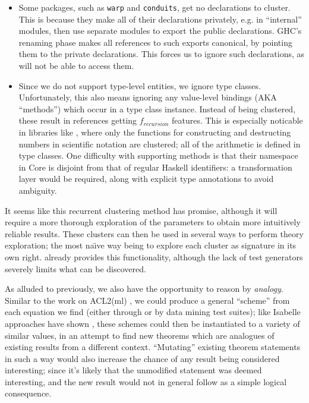 \begin{itemize}
\item Some packages, such as \texttt{warp} and \texttt{conduits}, get no
  declarations to cluster. This is because they make all of their declarations
  privately, e.g. in ``internal'' modules, then use separate modules to export
  the public declarations. GHC's renaming phase makes all references to such
  exports canonical, by pointing them to the private declarations. This forces
  us to ignore such declarations, as \quickspec{} will not be able to access them.

\item Since we do not support type-level entities, we ignore type
  classes. Unfortunately, this also means ignoring any value-level bindings (AKA
  ``methods'') which occur in a type class instance. Instead of being clustered,
  these result in references getting $f_{recursion}$ features. This is
  especially noticable in libraries like , where only the
  functions for constructing and destructing numbers in scientific notation are
  clustered; all of the arithmetic is defined in type classes. One difficulty
  with supporting methods is that their namespace in Core is disjoint from that
  of regular Haskell identifiers: a transformation layer would be required,
  along with explicit type annotations to avoid ambiguity.
\end{itemize}

It seems like this recurrent clustering method has promise, although it will
require a more thorough exploration of the parameters to obtain more intuitively
reliable results. These clusters can then be used in several ways to perform
theory exploration; the most na\"{\i}ve way being to explore each cluster as
\quickspec{} signature in its own right. \mlforhs{} already provides this
functionality, although the lack of test generators severely limits what can be
discovered.

As alluded to previously, we also have the opportunity to reason by
\emph{analogy}. Similar to the work on ACL2(ml) \cite{heras2013proof}, we could
produce a general ``scheme'' from each equation we find (either through \quickspec{}
or by data mining test suites); like Isabelle approaches have shown
\cite{Montano-Rivas.McCasland.Dixon.ea:2012}, these schemes could then be
instantiated to a variety of similar values, in an attempt to find new theorems
which are analogues of existing results from a different context. ``Mutating''
existing theorem statements in such a way would also increase the chance of any
result being considered interesting; since it's likely that the unmodified
statement was deemed interesting, and the new result would not in general follow
as a simple logical consequence.

